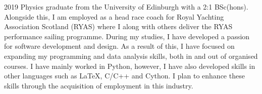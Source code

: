 

\begin{cvparagraph}
2019 Physics graduate from the University of Edinburgh with a 2:1 BSc(hons). Alongside this, I am employed as a head race coach for Royal Yachting Association Scotland (RYAS) where I along with others deliver the RYAS performance sailing programme. During my studies, I have developed a passion for software development and design. As a result of this, I have focused on expanding my programming and data analysis skills, both in and out of organised courses. I have mainly worked in Python, however, I have also developed skills in other languages such as LaTeX, C/C++ and Cython. I plan to enhance these skills through the acquisition of employment in this industry.


\end{cvparagraph}
